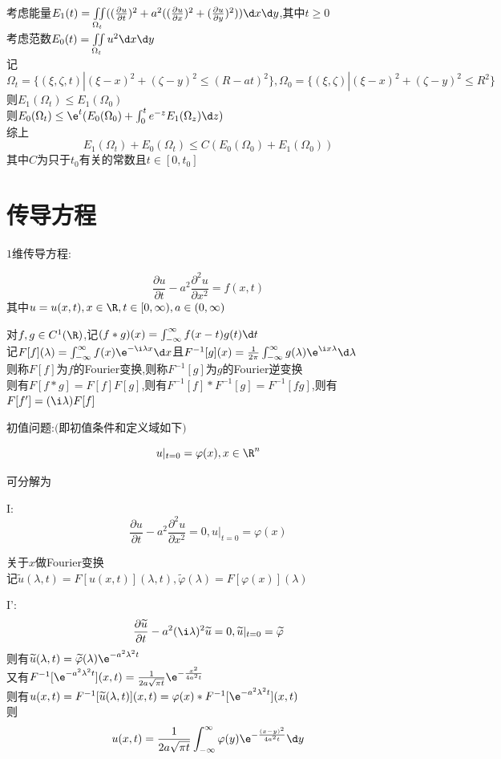 \begin{jie}
考虑能量$E_1(t)=\iint\limits_{\Omega_{t}}((\frac{\partial u}{\partial t})^2+a^2((\frac{\partial u}{\partial x})^2+(\frac{\partial u}{\partial y})^2))\d x\d y$,其中$t\geq 0$\\
考虑范数$E_0(t)=\iint\limits_{\Omega_{t}}u^2\d x\d y$\\
记$\Omega_t=\{(\xi,\zeta,t)|(\xi-x)^2+(\zeta-y)^2\leq (R-at)^2\},\Omega_0=\{(\xi,\zeta)|(\xi-x)^2+(\zeta-y)^2\leq R^2\}$\\
则$E_1(\Omega_t)\leq E_1(\Omega_0)$\\
则$E_0(\Omega_t)\leq \e^{t}(E_0(\Omega_0)+\int_{0}^{t}e^{-z}E_1(\Omega_{z})\d z)$\\
综上\[E_1(\Omega_t)+E_0(\Omega_t)\leq C(E_0(\Omega_0)+E_1(\Omega_0))\]
其中$C$为只于$t_0$有关的常数且$t\in[0,t_0]$
\end{jie}

\chapter{传导方程}

$1$维传导方程:

\[\frac{\partial u}{\partial t}-a^2\frac{\partial^2 u}{\partial x^2}=f(x,t)\]
其中$u=u(x,t),x\in\R,t\in [0,\infty),a\in(0,\infty)$

\begin{dingli*}
对$f,g\in C^{1}(\R)$,记$(f*g)(x)=\int_{-\infty}^{\infty}f(x-t)g(t)\d t$\\
记$F[f](\lambda)=\int_{-\infty}^{\infty}f(x)\e^{-\i\lambda x}\d x$且$F^{-1}[g](x)=\frac{1}{2\pi}\int_{-\infty}^{\infty}g(\lambda)\e^{\i x\lambda}\d\lambda$\\
则称$F[f]$为$f$的Fourier变换,则称$F^{-1}[g]$为$g$的Fourier逆变换\\
则有$F[f*g]=F[f]F[g]$,则有$F^{-1}[f]*F^{-1}[g]=F^{-1}[fg]$,则有$F[f']=(\i\lambda)F[f]$
\end{dingli*}

初值问题:$($即初值条件和定义域如下$)$

\[u|_{t=0}=\varphi(x),x\in\R^n\]

可分解为

I:\[\frac{\partial u}{\partial t}-a^2\frac{\partial^2u}{\partial x^2}=0,u|_{t=0}=\varphi(x)\]

\begin{jie}
关于$x$做Fourier变换\\
记$\widetilde{u}(\lambda,t)=F[u(x,t)](\lambda,t),\widetilde{\varphi}(\lambda)=F[\varphi(x)](\lambda)$

\rm{I}':
\[\frac{\partial\widetilde{u}}{\partial t}-a^2(\i\lambda)^2\widetilde{u}=0,\widetilde{u}|_{t=0}=\widetilde{\varphi}\]
则有$\widetilde{u}(\lambda,t)=\widetilde{\varphi}(\lambda)\e^{-a^2\lambda^2 t}$\\
又有$F^{-1}[\e^{-a^2\lambda^2 t}](x,t)=\frac{1}{2a\sqrt{\pi t}}\e^{-\frac{x^2}{4a^2 t}}$\\
则有$u(x,t)=F^{-1}[\widetilde{u}(\lambda,t)](x,t)=\varphi(x)*F^{-1}[\e^{-a^2\lambda^2 t}](x,t)$\\
则\[u(x,t)=\frac{1}{2a\sqrt{\pi t}}\int_{-\infty}^{\infty}\varphi(y)\e^{-\frac{(x-y)^2}{4a^2t}}\d y\]
\end{jie}

